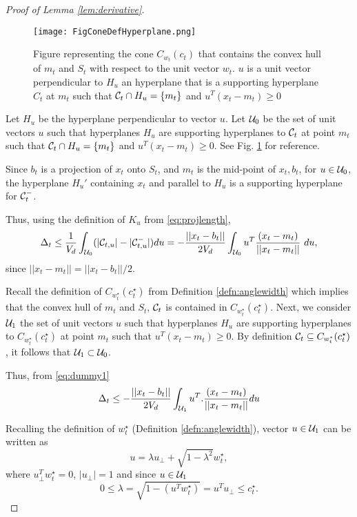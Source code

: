 \begin{proof}[Proof of Lemma \ref{lem:derivative}]
\begin{figure*}
\begin{center}
\texttt{[image: FigConeDefHyperplane.png]}
\caption{Figure representing the cone $C_{w_t}(c_t)$ that contains the convex hull of $m_t$ and $S_{t}$ with respect to the unit vector $w_t$. $u$ is a unit vector perpendicular to $H_u$ an hyperplane that is a supporting hyperplane $C_t$ at $m_t$ such that $\mathcal{C}_t \cap H_u = \{m_t\}$ and 
$u^T (x_t-m_t)\ge 0$ }
\label{fig:anglewidth}
\end{center}
\end{figure*}



Let $H_u$ be the hyperplane perpendicular to vector $u$.
 Let $\mathcal{U}_0$ be the set of unit vectors $u$ such that hyperplanes $H_u$ are supporting hyperplanes to $\mathcal{C}_t$ at point $m_t$ such that $\mathcal{C}_t \cap H_u = \{m_t\}$ and 
$u^T (x_t-m_t)\ge 0$.  See Fig. \ref{fig:anglewidth} for reference.

 Since $b_t$ is a projection of $x_t$ onto $S_{t}$, and $m_t$ is the mid-point of $x_t,b_t$, for $u\in \mathcal{U}_0$, the hyperplane $H_u'$ containing $x_t$ and parallel to $H_u$ is a supporting hyperplane for $\mathcal{C}_t^-$.  


Thus, using the definition of $K_u$ from \eqref{eq:projlength},
\begin{equation}\label{eq:dummy1}
\Delta_t  \le \frac{1}{V_d} \int_{\mathcal{U}_0} (|\mathcal{C}_{t,u}| - |\mathcal{C}_{t,u}^-|) du= -\frac{||x_t-b_t||}{2V_d} \int_{\mathcal{U}_0} u^T 
\frac{(x_t-m_t)}{||x_t-m_t||}  \ du,
\end{equation}
since $||x_t-m_t|| = ||x_t-b_t||/2$.

Recall the definition of $C_{w_t^\star}(c_t^\star)$ from Definition \ref{defn:anglewidth} which implies that the convex hull of $m_t$ and $S_{t}$, $\mathcal{C}_t$ is contained in $C_{w_t^\star}(c_t^\star)$.
Next, we consider $\mathcal{U}_1$ the set of unit vectors $u$ such that hyperplanes $H_u$ are supporting hyperplanes to $C_{w_t^\star}(c_t^\star)$ at point $m_t$ 
such that $u^T (x_t-m_t)\ge 0$. 
By definition $\mathcal{C}_t\subseteq C_{w_t^\star}(c_t^\star)$, it follows that 
$\mathcal{U}_1\subset \mathcal{U}_0$.

Thus, from \eqref{eq:dummy1}
 \begin{equation}\label{eq:dummy2}
\Delta_t  \le -\frac{||x_t-b_t||}{2V_d} \int_{\mathcal{U}_1} u^T. \frac{(x_t-m_t)}{||x_t-m_t||} du
\end{equation}

Recalling the definition of $w_t^\star$ (Definition \ref{defn:anglewidth}), 
vector $u\in \mathcal{U}_1$ can be written as 
$$ u = \lambda u_{\perp} + \sqrt{1-\lambda^2} w_t^\star,$$
where $u_{\perp}^T w_t^\star=0$, $|u_{\perp}|=1$ and since $u\in \mathcal{U}_1$
$$0 \le \lambda=\sqrt{1-(u^Tw_t^\star)} = u^Tu_{\perp}\le c_t^\star.$$


\end{proof}
